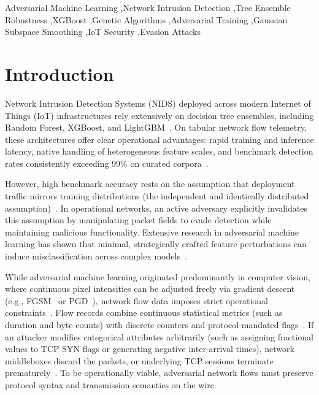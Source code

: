\documentclass[final,5p,times,twocolumn]{elsarticle}
\begin{document}
\begin{frontmatter}
\begin{keyword}
Adversarial Machine Learning \sep Network Intrusion Detection \sep Tree Ensemble Robustness \sep XGBoost \sep Genetic Algorithms \sep Adversarial Training \sep Gaussian Subspace Smoothing \sep IoT Security \sep Evasion Attacks
\end{keyword}

\end{frontmatter}

\section{Introduction}
\label{sec:intro}

Network Intrusion Detection Systems (NIDS) deployed across modern Internet of Things (IoT) infrastructures rely extensively on decision tree ensembles, including Random Forest, XGBoost, and LightGBM~\cite{breiman2001random,chen2016xgboost,ke2017lightgbm,hussain2020survey}. On tabular network flow telemetry, these architectures offer clear operational advantages: rapid training and inference latency, native handling of heterogeneous feature scales, and benchmark detection rates consistently exceeding 99\% on curated corpora~\cite{ring2019survey}.

However, high benchmark accuracy rests on the assumption that deployment traffic mirrors training distributions (the independent and identically distributed assumption)~\cite{sommer2010outside}. In operational networks, an active adversary explicitly invalidates this assumption by manipulating packet fields to evade detection while maintaining malicious functionality. Extensive research in adversarial machine learning has shown that minimal, strategically crafted feature perturbations can induce misclassification across complex models~\cite{goodfellow2014explaining,madry2018towards,carlini2017evaluating}.

While adversarial machine learning originated predominantly in computer vision, where continuous pixel intensities can be adjusted freely via gradient descent (e.g., FGSM~\cite{goodfellow2014explaining} or PGD~\cite{madry2018towards}), network flow data imposes strict operational constraints~\cite{corona2013adversarial,apruzzese2022modeling}. Flow records combine continuous statistical metrics (such as duration and byte counts) with discrete counters and protocol-mandated flags~\cite{pierazzi2020intriguing,sheatsley2022space}. If an attacker modifies categorical attributes arbitrarily (such as assigning fractional values to TCP SYN flags or generating negative inter-arrival times), network middleboxes discard the packets, or underlying TCP sessions terminate prematurely~\cite{apruzzese2022modeling}. To be operationally viable, adversarial network flows must preserve protocol syntax and transmission semantics on the wire.
\end{document}
